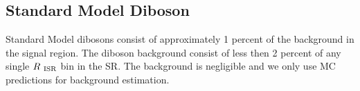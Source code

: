 \subsection{Standard Model Diboson}
\label{sec:Bkg:diboson}

Standard Model dibosons consist of approximately 1 percent of the background in the signal region.  The diboson background consist of less then 2 percent of any single $R_{~\mathrm{ISR}}$ bin in the SR.  The background is negligible and we only use MC predictions for background estimation.